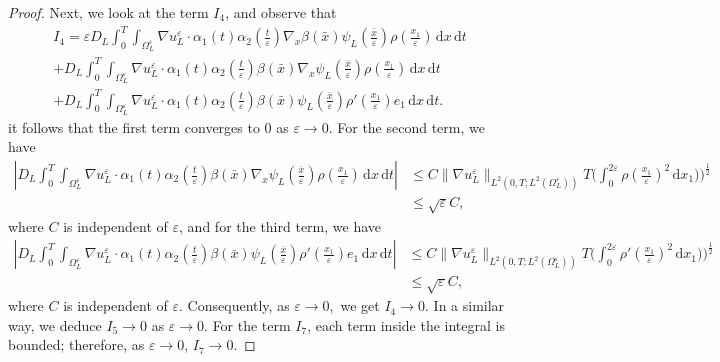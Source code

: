 \documentclass[10pt,a4paper]{amsart}
\newcommand{\di}[1]{\,\mathrm{d}#1}
\def\es{\varepsilon}
\def\oll{\Omega_L^\varepsilon}
\begin{document}
\begin{proof}
Next, we look at the term $I_4$, and observe that
\begin{multline*}
  I_4
    =\es D_L\int_0^T\int_{\oll}\nabla u_L^\es \cdot \alpha_1(t)\alpha_2(\frac{t}{\es})  \nabla_{ x} \beta(\bar x) \psi_L(\frac{\bar x}{\es})\rho(\frac{x_1}{\es})   \di{x}\di{t}\\
    +D_L\int_0^T\int_{\oll}\nabla u_L^\es \cdot \alpha_1(t)\alpha_2(\frac{t}{\es})  \beta(\bar x)  \nabla_{ x}\psi_L(\frac{\bar x}{\es})\rho(\frac{x_1}{\es})   \di{x}\di{t}\\
    +D_L\int_0^T\int_{\oll}\nabla u_L^\es \cdot \alpha_1(t)\alpha_2(\frac{t}{\es})  \beta(\bar x)  \psi_L(\frac{\bar x}{\es})\rho'(\frac{x_1}{\es})e_1   \di{x}\di{t}.
\end{multline*}
it follows that the first term converges to $0$ as $\es\rightarrow0$. For the second term, we have
\begin{align*}
    \left|D_L\int_0^T\int_{\oll}\nabla u_L^\es \cdot \alpha_1(t)\alpha_2(\frac{t}{\es})  \beta(\bar x)  \nabla_{ x}\psi_L(\frac{\bar x}{\es})\rho(\frac{x_1}{\es})   \di{x}\di{t}\right|&\leq C \|\nabla u_L^\es\|_{L^2(0,T;L^2(\oll))}T\Big(\int_0^{2\es}\rho(\frac{x_1}{\es})^2\di{x_1})\Big)^{\frac{1}{2}}\\
    &\leq \sqrt{\es} C,
\end{align*}
where $C$ is independent of $\es$, and for the third term, we have
\begin{align*}
    \left|D_L\int_0^T\int_{\oll}\nabla u_L^\es \cdot \alpha_1(t)\alpha_2(\frac{t}{\es})  \beta(\bar x)  \psi_L(\frac{\bar x}{\es})\rho'(\frac{x_1}{\es}) e_1  \di{x}\di{t}\right|&\leq C \|\nabla u_L^\es\|_{L^2(0,T;L^2(\oll))}T\Big(\int_0^{2\es}\rho'(\frac{x_1}{\es})^2\di{x_1})\Big)^{\frac{1}{2}}\\
    &\leq \sqrt{\es} C,
\end{align*}
where $C$ is independent of $\es$. Consequently,  as $\es\rightarrow 0,$  we get $I_4\rightarrow 0.$ In a similar way, we deduce $I_5\rightarrow 0$ as $\es\rightarrow 0$. For the term $I_7$, each term inside the integral is bounded; therefore, as $\es\rightarrow 0$, $I_7\rightarrow 0$.


\end{proof}
\end{document}
